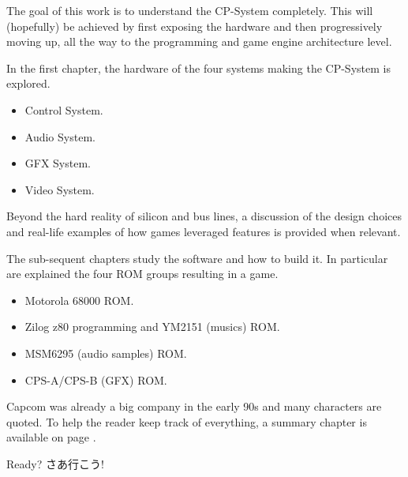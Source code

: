 The goal of this work is to understand the CP-System completely. This will (hopefully) be achieved by first exposing the hardware and then progressively moving up, all the way to the programming and game engine architecture level.

In the first chapter, the hardware of the four systems making the CP-System is explored.
\begin{itemize}[topsep=0pt]
\item Control System.
\item Audio System.
\item GFX System.
\item Video System.
\end{itemize}
 Beyond the hard reality of silicon and bus lines, a discussion of the design choices and real-life examples of how games leveraged features is provided when relevant.


The sub-sequent chapters study the software and how to build it. In particular are explained the four ROM groups resulting in a game. 

\begin{itemize}[topsep=0pt]
\item Motorola 68000 ROM.
\item Zilog z80 programming and YM2151 (musics) ROM.
\item MSM6295 (audio samples) ROM.
\item CPS-A/CPS-B (GFX) ROM.
\end{itemize}

Capcom was already a big company in the early 90s and many characters are quoted. To help the reader keep track of everything, a summary chapter is available on page \pageref{people}.

\begin{CJK}{UTF8}{min}
Ready? さあ行こう!
\end{CJK}



